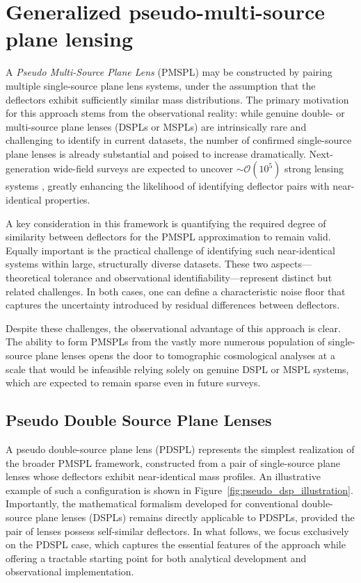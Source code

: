 \documentclass[a4paper,11pt]{article}
\newcommand{\paras}[1]{{\color{red}{PS:- #1}}}
\begin{document}
\section{Generalized pseudo-multi-source plane lensing}\label{sec:pseudo_multi_plane_formalism}
A \emph{Pseudo Multi-Source Plane Lens} (PMSPL) may be constructed by pairing multiple single-source plane lens systems, under the assumption that the deflectors exhibit sufficiently similar mass distributions. The primary motivation for this approach stems from the observational reality: while genuine double- or multi-source plane lenses (DSPLs or MSPLs) are intrinsically rare and challenging to identify in current datasets, the number of confirmed single-source plane lenses is already substantial and poised to increase dramatically. Next-generation wide-field surveys are expected to uncover $\sim\mathcal{O}(10^5)$ strong lensing systems \citep{Shajib:2024}, greatly enhancing the likelihood of identifying deflector pairs with near-identical properties.

A key consideration in this framework is quantifying the required degree of similarity between deflectors for the PMSPL approximation to remain valid. Equally important is the practical challenge of identifying such near-identical systems within large, structurally diverse datasets. These two aspects—theoretical tolerance and observational identifiability—represent distinct but related challenges. In both cases, one can define a characteristic noise floor that captures the uncertainty introduced by residual differences between deflectors.

Despite these challenges, the observational advantage of this approach is clear. The ability to form PMSPLs from the vastly more numerous population of single-source plane lenses opens the door to tomographic cosmological analyses at a scale that would be infeasible relying solely on genuine DSPL or MSPL systems, which are expected to remain sparse even in future surveys.

\subsection{Pseudo Double Source Plane Lenses}
A pseudo double-source plane lens (PDSPL) represents the simplest realization of the broader PMSPL framework, constructed from a pair of single-source plane lenses whose deflectors exhibit near-identical mass profiles. An illustrative example of such a configuration is shown in Figure~\ref{fig:pseudo_dsp_illustration}. Importantly, the mathematical formalism developed for conventional double-source plane lenses (DSPLs) remains directly applicable to PDSPLs, provided the pair of lenses possess self-similar deflectors.
In what follows, we focus exclusively on the PDSPL case, which captures the essential features of the approach while offering a tractable starting point for both analytical development and observational implementation.
\end{document}
